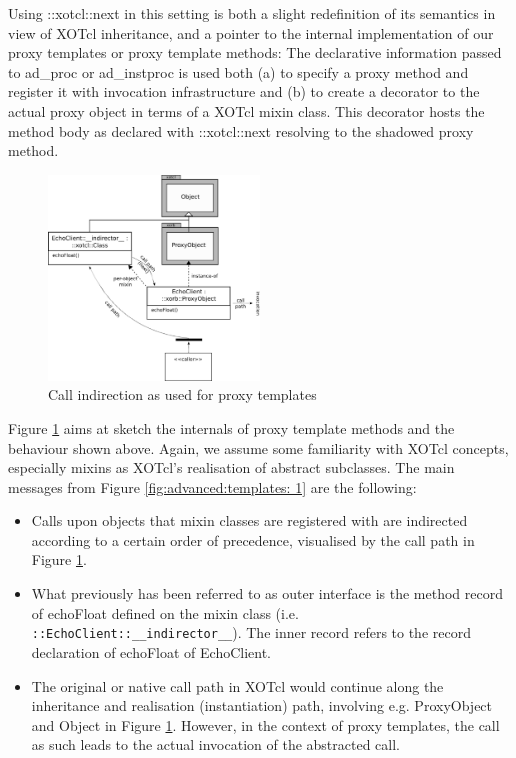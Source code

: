 Using ::xotcl::next in this setting is both a slight redefinition of its semantics in view of XOTcl inheritance, 
and a pointer to the internal implementation of our proxy templates or proxy template methods: The 
declarative information passed to ad\_proc or ad\_instproc is used both (a) to specify a proxy method 
and register it with invocation infrastructure and (b) to create a decorator to the actual proxy object in 
terms of a XOTcl mixin class. This decorator hosts the method body as declared with ::xotcl::next 
resolving to the shadowed proxy method.

\begin{figure}[htbp]
\begin{center}
\includegraphics[width=0.5\textwidth]{img/proxy-template.png}
\caption{Call indirection as used for proxy templates}
\label{fig:advanced:templates:1}
\end{center}
\end{figure}

Figure \ref{fig:advanced:templates:1} aims at sketch the internals of proxy template methods and the 
behaviour shown above. Again, we assume some familiarity with XOTcl concepts, especially mixins as 
XOTcl's realisation of abstract subclasses. The main messages from Figure \ref{fig:advanced:templates:
1} are the following:
\begin{itemize}
\item Calls upon objects that mixin classes are registered with are indirected according to a certain order 
of precedence, visualised by the call path in Figure  \ref{fig:advanced:templates:1}.
\item What previously has been referred to as outer interface is the method record of echoFloat defined 
on the mixin class (i.e. \lstinline!::EchoClient::__indirector__!). The inner record refers to the record 
declaration of echoFloat of EchoClient.
\item The original or native call path in XOTcl would continue along the inheritance and realisation 
(instantiation) path, involving e.g. ProxyObject and Object in Figure  \ref{fig:advanced:templates:1}. 
However, in the context of proxy templates, the call as such leads to the actual invocation of the 
abstracted call.
\end{itemize}
